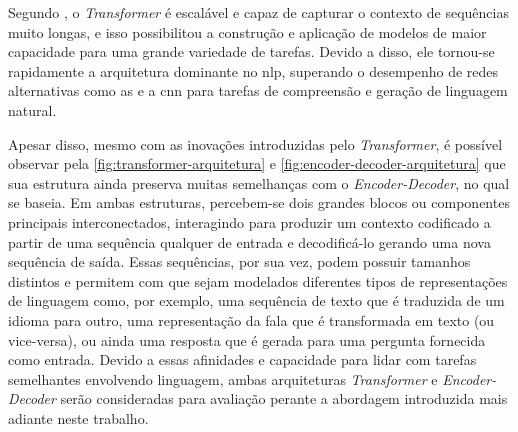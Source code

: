 Segundo , o \textit{Transformer} é escalável e capaz de capturar o contexto de sequências muito longas, e isso possibilitou a construção e aplicação de modelos de maior capacidade para uma grande variedade de tarefas. 
Devido a disso, ele tornou-se rapidamente a arquitetura dominante no \acrshort{nlp}, superando o desempenho de redes alternativas como as  e a \acrfull{cnn} para tarefas  de compreensão e geração de linguagem natural.







Apesar disso, mesmo com as inovações introduzidas pelo \textit{Transformer}, é possível observar pela \autoref{fig:transformer-arquitetura} e \autoref{fig:encoder-decoder-arquitetura} que sua estrutura ainda preserva muitas semelhanças com o \textit{Encoder-Decoder}, no qual se baseia.
Em ambas estruturas, percebem-se dois grandes blocos ou componentes principais interconectados, interagindo para produzir um contexto codificado a partir de uma sequência qualquer de entrada e decodificá-lo gerando uma nova sequência de saída. 
Essas sequências, por sua vez, podem possuir tamanhos distintos e permitem com que sejam modelados diferentes tipos de representações de linguagem como, por exemplo, uma sequência de texto que é traduzida de um idioma para outro, uma representação da fala que é transformada em texto (ou vice-versa), ou ainda uma resposta que é gerada para uma pergunta fornecida como entrada.
Devido a essas afinidades e capacidade para lidar com tarefas semelhantes envolvendo linguagem, ambas arquiteturas \textit{Transformer} e \textit{Encoder-Decoder} serão consideradas para avaliação perante a abordagem introduzida mais adiante neste trabalho.


